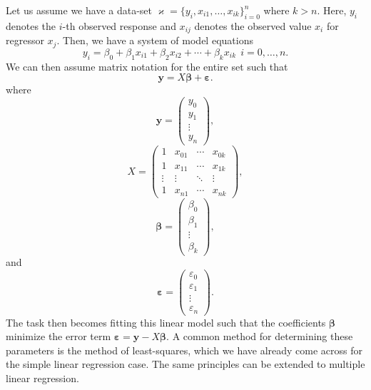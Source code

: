 \documentclass[10pt,a4paper, onecolumn, conference]{IEEEtran}
\theoremstyle{own}
\theoremstyle{definition}
\theoremstyle{plain}
\begin{document}
Let us assume we have a data-set $\varkappa = \{y_i, x_{i1}, \ldots, x_{ik} \}_{i=0}^n$ where $k > n$. Here, $y_i$ denotes the $i$-th observed response and $x_{ij}$ denotes the observed value $x_i$ for regressor $x_j$. Then, we have a system of model equations
\begin{equation}
y_i = \beta_0 + \beta_1 x_{i1} + \beta_2 x_{i2} + \cdots + \beta_k x_{ik} ~~ i = 0, \ldots, n.
\end{equation}
We can then assume matrix notation for the entire set such that
\begin{equation}
\mathbf{y} = X \boldsymbol\beta + \boldsymbol\varepsilon.
\end{equation}
where
\begin{equation}
\mathbf{y} = \left( \begin{matrix} y_0 \\ y_1 \\ \vdots \\ y_n \end{matrix} \right),
\end{equation}
\begin{equation}
X = \left( \begin{matrix}
1 & x_{01} & \cdots & x_{0k} \\
1 & x_{11} & \cdots & x_{1k} \\
\vdots & \vdots & \ddots & \vdots \\
1 & x_{n1} & \cdots & x_{nk} 
\end{matrix} \right),
\end{equation}
\begin{equation}
\boldsymbol\beta = \left( \begin{matrix} \beta_0 \\ \beta_1 \\ \vdots \\ \beta_k \end{matrix} \right),
\end{equation}
and
\begin{equation}
\boldsymbol\varepsilon = \left( \begin{matrix} \varepsilon_0 \\ \varepsilon_1 \\ \vdots \\ \varepsilon_n \end{matrix} \right).
\end{equation}
The task then becomes fitting this linear model such that the coefficients $\boldsymbol\beta$ minimize the error term $\boldsymbol\varepsilon = \mathbf{y} - X \boldsymbol\beta$. A common method for determining these parameters is the method of least-squares, which we have already come across for the simple linear regression case. The same principles can be extended to multiple linear regression.
\end{document}
